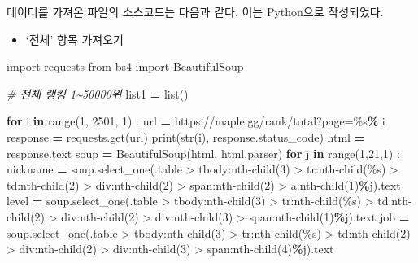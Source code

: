 \documentclass[
]{article}
\newenvironment{Shaded}{\begin{snugshade}}{\end{snugshade}}
\newcommand{\BuiltInTok}[1]{#1}
\newcommand{\CommentTok}[1]{\textcolor[rgb]{0.56,0.35,0.01}{\textit{#1}}}
\newcommand{\ControlFlowTok}[1]{\textcolor[rgb]{0.13,0.29,0.53}{\textbf{#1}}}
\newcommand{\DecValTok}[1]{\textcolor[rgb]{0.00,0.00,0.81}{#1}}
\newcommand{\ImportTok}[1]{#1}
\newcommand{\KeywordTok}[1]{\textcolor[rgb]{0.13,0.29,0.53}{\textbf{#1}}}
\newcommand{\NormalTok}[1]{#1}
\newcommand{\OperatorTok}[1]{\textcolor[rgb]{0.81,0.36,0.00}{\textbf{#1}}}
\newcommand{\SpecialCharTok}[1]{\textcolor[rgb]{0.00,0.00,0.00}{#1}}
\newcommand{\StringTok}[1]{\textcolor[rgb]{0.31,0.60,0.02}{#1}}
\providecommand{\tightlist}{%
  \setlength{\itemsep}{0pt}\setlength{\parskip}{0pt}}
\begin{document}
데이터를 가져온 파일의 소스코드는 다음과 같다. 이는 Python으로
작성되었다.

\begin{itemize}
\tightlist
\item
  `전체' 항목 가져오기
\end{itemize}

\begin{Shaded}
\begin{Highlighting}[]
\ImportTok{import}\NormalTok{ requests}
\ImportTok{from}\NormalTok{ bs4 }\ImportTok{import}\NormalTok{ BeautifulSoup}

\CommentTok{\# 전체 랭킹 1\textasciitilde{}50000위}
\NormalTok{list1 }\OperatorTok{=} \BuiltInTok{list}\NormalTok{()}

\ControlFlowTok{for}\NormalTok{ i }\KeywordTok{in} \BuiltInTok{range}\NormalTok{(}\DecValTok{1}\NormalTok{, }\DecValTok{2501}\NormalTok{, }\DecValTok{1}\NormalTok{) :}
\NormalTok{    url }\OperatorTok{=} \StringTok{\textquotesingle{}https://maple.gg/rank/total?page=}\SpecialCharTok{\%s}\StringTok{\textquotesingle{}}\OperatorTok{\%}\NormalTok{ i}
\NormalTok{    response }\OperatorTok{=}\NormalTok{ requests.get(url)}
    \BuiltInTok{print}\NormalTok{(}\BuiltInTok{str}\NormalTok{(i), response.status\_code)}
\NormalTok{    html }\OperatorTok{=}\NormalTok{ response.text}
\NormalTok{    soup }\OperatorTok{=}\NormalTok{ BeautifulSoup(html, }\StringTok{\textquotesingle{}html.parser\textquotesingle{}}\NormalTok{)}
    \ControlFlowTok{for}\NormalTok{ j }\KeywordTok{in} \BuiltInTok{range}\NormalTok{(}\DecValTok{1}\NormalTok{,}\DecValTok{21}\NormalTok{,}\DecValTok{1}\NormalTok{) :}
\NormalTok{        nickname }\OperatorTok{=}\NormalTok{ soup.select\_one(}\StringTok{\textquotesingle{}.table \textgreater{} tbody:nth{-}child(3) \textgreater{} tr:nth{-}child(}\SpecialCharTok{\%s}\StringTok{) \textgreater{} td:nth{-}child(2) \textgreater{} div:nth{-}child(2) \textgreater{} span:nth{-}child(2) \textgreater{} a:nth{-}child(1)\textquotesingle{}}\OperatorTok{\%}\NormalTok{j).text}
\NormalTok{        level }\OperatorTok{=}\NormalTok{ soup.select\_one(}\StringTok{\textquotesingle{}.table \textgreater{} tbody:nth{-}child(3) \textgreater{} tr:nth{-}child(}\SpecialCharTok{\%s}\StringTok{) \textgreater{} td:nth{-}child(2) \textgreater{} div:nth{-}child(2) \textgreater{} div:nth{-}child(3) \textgreater{} span:nth{-}child(1)\textquotesingle{}}\OperatorTok{\%}\NormalTok{j).text}
\NormalTok{        job }\OperatorTok{=}\NormalTok{ soup.select\_one(}\StringTok{\textquotesingle{}.table \textgreater{} tbody:nth{-}child(3) \textgreater{} tr:nth{-}child(}\SpecialCharTok{\%s}\StringTok{) \textgreater{} td:nth{-}child(2) \textgreater{} div:nth{-}child(2) \textgreater{} div:nth{-}child(3) \textgreater{} span:nth{-}child(4)\textquotesingle{}}\OperatorTok{\%}\NormalTok{j).text}

\end{Highlighting}
\end{Shaded}
\end{document}
